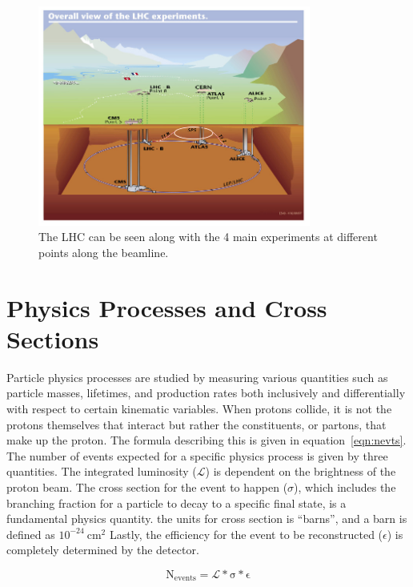 \begin{figure}[!ht]
  \begin{center}
    \includegraphics[width=0.8\textwidth]{cms/figs/lhc-underground.jpeg}
    \caption{ The LHC can be seen along with the 4 main experiments at different points along the beamline.
      \label{fig:lhcunderground}
    }
  \end{center}
\end{figure}

\section{Physics Processes and Cross Sections}
Particle physics processes are studied by measuring various quantities such as particle masses,
lifetimes, and production rates both inclusively and differentially with respect to certain kinematic variables.
When protons collide,
it is not the protons themselves that interact but rather the constituents, or partons, that make up the proton.
The formula describing this is given in equation~\ref{eqn:nevts}.
The number of events expected for a specific physics process is given by three quantities.
The integrated luminosity ($\mathcal{L}$) is dependent on the brightness of the proton beam.
The cross section for the event to happen ($\sigma$),
which includes the branching fraction for a particle to decay to a specific final state,
is a fundamental physics quantity.
the units for cross section is ``barns'', and a barn is defined as $\mathrm{10^{-24}~cm^{2}}$
Lastly, the efficiency for the event to be reconstructed ($\epsilon$) is completely determined by the detector.

\begin{equation}
\label{eqn:nevts}
  \mathrm{N_{events} = \mathcal{L} * \sigma * \epsilon}
\end{equation}

